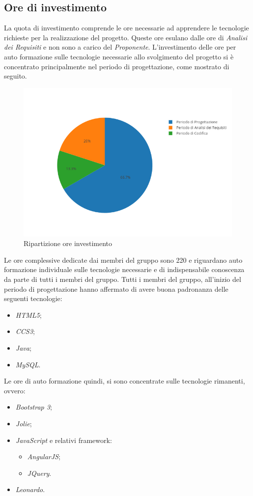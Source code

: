 \subsection{Ore di investimento}
La quota di investimento comprende le ore necessarie ad apprendere le tecnologie richieste per la realizzazione del progetto. Queste ore esulano dalle ore di \textit{Analisi dei Requisiti} e non sono a carico del \textit{Proponente}. L'investimento delle ore per auto formazione sulle tecnologie necessarie allo svolgimento del progetto si è concentrato principalmente nel periodo di progettazione, come mostrato di seguito.
\begin{figure}[H]
	\centering
	\includegraphics[scale=0.6]{img/ore_investimento_periodi}
	\caption{Ripartizione ore investimento}
	\label{fig:oreinvestimentoperiodi}
\end{figure}
Le ore complessive dedicate dai membri del gruppo sono 220 e riguardano auto formazione individuale sulle tecnologie necessarie e di indispensabile conoscenza da parte di tutti i membri del gruppo. Tutti i membri del gruppo, all'inizio del periodo di progettazione hanno affermato di avere buona padronanza delle seguenti tecnologie:
\begin{itemize}
	\item \textit{HTML5};
	\item \textit{CCS3};
	\item \textit{Java};
	\item \textit{MySQL}.
\end{itemize}
Le ore di auto formazione quindi, si sono concentrate sulle tecnologie rimanenti, ovvero:
\begin{itemize}
	\item \textit{Bootstrap 3};
	\item \textit{Jolie};
	\item \textit{JavaScript} e relativi framework:
	\begin{itemize}
		\item \textit{AngularJS};
		\item \textit{JQuery}.
	\end{itemize}
	\item \textit{Leonardo}.
\end{itemize}
